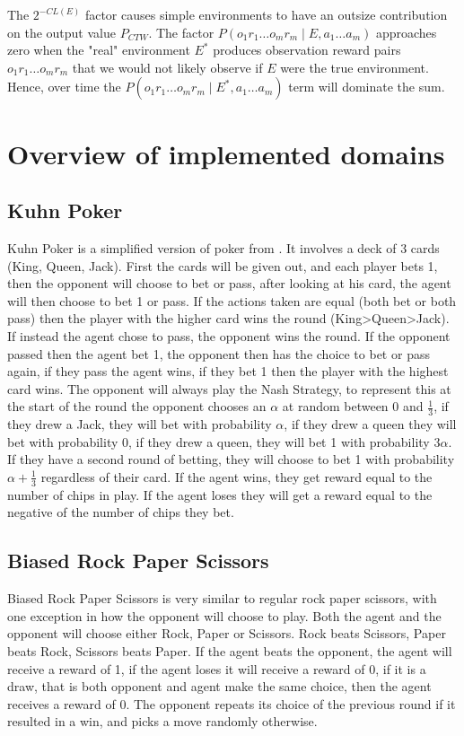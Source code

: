 \documentclass{article}
\theoremstyle{definition}
\newtheorem{primary statistics}[definition]{Primary Statistics}
\newtheorem{auxiliary statistics}[definition]{Auxiliary Statistics}
\begin{document}
The $2^{-CL(E)}$ factor causes simple environments to have an outsize contribution on the output value $P_{CTW}$. The factor $P(o_1r_1 \ldots o_mr_m \mid E, a_1 \ldots a_m)$ approaches zero when the "real" environment $E^*$ produces observation reward pairs $o_1r_1 \ldots o_mr_m$ that we would not likely observe if $E$ were the true environment. Hence, over time the $P(o_1r_1 \ldots o_mr_m \mid E^*, a_1 \ldots a_m)$ term will dominate the sum. 


\section{Overview of implemented domains}
\subsection{Kuhn Poker}
Kuhn Poker is a simplified version of poker from \citep{kuhn1950simplified}. It involves a deck of 3 cards (King, Queen, Jack). First the cards will be given out, and each player bets 1, then the opponent will choose to bet or pass, after looking at his card, the agent will then choose to bet 1 or pass. If the actions taken are equal (both bet or both pass) then the player with the higher card wins the round (King>Queen>Jack). If instead the agent chose to pass, the opponent wins the round. If the opponent passed then the agent bet 1, the opponent then has the choice to bet or pass again, if they pass the agent wins, if they bet 1 then the player with the highest card wins. The opponent will always play the Nash Strategy, to represent this at the start of the round the opponent chooses an $\alpha$ at random between 0 and $\frac{1}{3}$, if they drew a Jack, they will bet with probability $\alpha$, if they drew a queen they will bet with probability 0, if they drew a queen, they will bet 1 with probability $3\alpha$. If they have a second round of betting, they will choose to bet 1 with probability $\alpha+\frac{1}{3}$ regardless of their card. If the agent wins, they get reward equal to the number of chips in play. If the agent loses they will get a reward equal to the negative of the number of chips they bet.


\subsection{Biased Rock Paper Scissors}
Biased Rock Paper Scissors is very similar to regular rock paper scissors, with one exception in how the opponent will choose to play. Both the agent and the opponent will choose either Rock, Paper or Scissors. Rock beats Scissors, Paper beats Rock, Scissors beats Paper. If the agent beats the opponent, the agent will receive a reward of 1, if the agent loses it will receive a reward of 0, if it is a draw, that is both opponent and agent make the same choice, then the agent receives a reward of 0. The opponent repeats its choice of the previous round if it resulted in a win, and picks a move randomly otherwise. 
\end{document}
